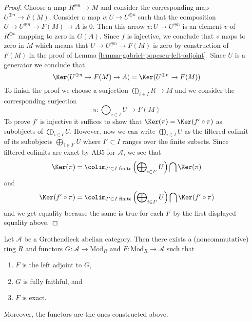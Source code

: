 \begin{proof}
Choose a map $R^{\oplus n} \to M$ and consider the corresponding map
$U^{\oplus n} \to F(M)$. Consider a map $v : U \to U^{\oplus n}$
such that the composition $U \to U^{\oplus n} \to F(M) \to A$ is $0$.
Then this arrow $v : U \to U^{\oplus n}$ is an element
$v$ of $R^{\oplus n}$ mapping to zero in $G(A)$. Since $f$ is injective,
we conclude that $v$ maps to zero in $M$ which means that
$U \to U^{\oplus n} \to F(M)$ is zero by construction of $F(M)$
in the proof of Lemma \ref{lemma-gabriel-popescu-left-adjoint}.
Since $U$ is a generator we conclude that
$$
\Ker(U^{\oplus n} \to F(M) \to A) = \Ker(U^{\oplus n} \to F(M))
$$
To finish the proof we choose a surjection $\bigoplus_{i \in I} R \to M$
and we consider the corresponding surjection
$$
\pi : \bigoplus\nolimits_{i \in I} U \longrightarrow F(M)
$$
To prove $f'$ is injective it suffices to show that
$\Ker(\pi) = \Ker(f' \circ \pi)$ as subobjects of $\bigoplus_{i \in I} U$.
However, now we can write $\bigoplus_{i \in I} U$ as the filtered colimit
of its subobjects $\bigoplus_{i \in I'} U$ where $I' \subset I$
ranges over the finite subsets. Since filtered colimits are
exact by AB5 for $\mathcal{A}$, we see that
$$
\Ker(\pi) =
\colim_{I' \subset I\text{ finite}}
\left(\bigoplus\nolimits_{i \in I'} U\right)
\bigcap \Ker(\pi)
$$
and
$$
\Ker(f' \circ \pi) =
\colim_{I' \subset I\text{ finite}}
\left(\bigoplus\nolimits_{i \in I'} U\right)
\bigcap \Ker(f' \circ \pi)
$$
and we get equality because the same is true for each $I'$ by
the first displayed equality above.
\end{proof}

\begin{theorem}
\label{theorem-gabriel-popescu}
Let $\mathcal{A}$ be a Grothendieck abelian category. Then there exists
a (noncommutative) ring $R$ and functors $G : \mathcal{A} \to \text{Mod}_R$
and $F : \text{Mod}_R \to \mathcal{A}$ such that
\begin{enumerate}
\item $F$ is the left adjoint to $G$,
\item $G$ is fully faithful, and
\item $F$ is exact.
\end{enumerate}
Moreover, the functors are the ones constructed above.
\end{theorem}

